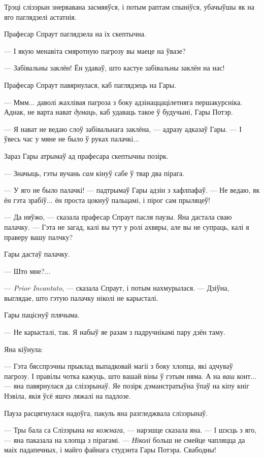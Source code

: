 Трэці слізэрын знервавана засмяяўся, і потым раптам спыніўся, убачыўшы як на яго
паглядзелі астатнія.

Прафесар Спраут паглядзела на іх скептычна. 

--- І якую менавіта смяротную пагрозу вы маеце на ўвазе?

--- Забівальны заклён! Ён удаваў, што кастуе забівальны заклён на нас!

Прафесар Спраут павярнулася, каб паглядзець на Гары.

--- Ммм... даволі жахлівая пагроза з боку адзінаццацілетняга першакурсніка.
Аднак, не варта нават \emph{думаць}, каб удаваць такое ў будучыні, Гары Потэр. 

--- Я нават не ведаю слоў забівальнага заклёна, --- адразу адказаў Гары. ---
І ўвесь час у мяне не было ў руках палачкі...  

Зараз Гары атрымаў ад прафесара скептычны позірк.

--- Значыць, гэты вучань \emph{сам} кінуў сабе ў твар два пірага.

--- У яго не было палачкі! --- падтрымаў Гары адзін з хафлпафаў. --- Не ведаю, 
як ён гэта зрабіў... ён проста цокнуў пальцамі, і пірог сам прыляцеў!

--- Да няўжо, --- сказала прафесар Спраут пасля паузы. Яна дастала сваю палачку. ---
Гэта не загад, калі вы тут у ролі ахвяры, але вы не супраць, калі я 
праверу вашу палчку?

Гары дастаў палачку.

--- Што мне?...

--- \emph{Prior Incantato,} --- сказала Спраут, і потым нахмурылася. --- Дзіўна,
выглядае, што гэтую палачку ніколі не карысталі.

Гары паціснуў плячыма. 

--- Не карысталі, так. Я набыў яе разам з падручнікамі пару дзён таму.

Яна кіўнула:

--- Гэта бясспрэчны прыклад выпадковай магіі з боку хлопца, які адчуваў пагрозу.
І правілы чотка кажуць, што вашай віны ў гэтым няма. А на \emph{ваш} конт... ---
яна павярнулася да слізэрынаў. Яе позірк дэманстратыўна ўпаў на кіпу кніг Нэвіла, 
якія ўсё яшчэ ляжалі на падлозе.

Пауза расцягнулася надоўга, пакуль яна разгледжвала слізэрынаў.

--- Тры бала са Слізэрына \emph{на кожнага}, --- нарэшце сказала яна. --- І шэсць 
з яго, --- яна паказала на хлопца з пірагамі. --- \emph{Ніколі} больш не смейце чапляцца
да маіх падапечных, і майго файнага студэнта Гары Потэра. Свабодны!

